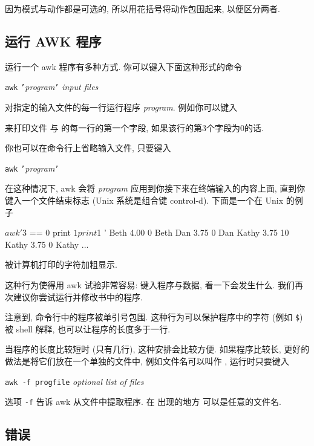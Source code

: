因为模式与动作都是可选的, 所以用花括号将动作包围起来, 以便区分两者.

\subsection{运行 AWK 程序}
\label{running_an_awk_program}

运行一个 awk 程序有多种方式. 你可以键入下面这种形式的命令
\begin{pattern}
    \texttt{awk} \texttt{'}\textit{program}\texttt{'} \textit{input files}
\end{pattern}
对指定的输入文件的每一行运行程序 \textit{program}. 例如你可以键入
来打印文件  与  的每一行的第一个字段,
如果该行的第3个字段为0的话.

你也可以在命令行上省略输入文件, 只要键入
\begin{pattern}
    \texttt{awk} \texttt{'}\textit{program}\texttt{'}
\end{pattern}
在这种情况下, awk 会将 \textit{program} 应用到你接下来在终端输入的内容上面,
直到你键入一个文件结束标志 (Unix 系统是组合键 control-d). 下面是一个在 Unix
的例子
\begin{shell}
    $ awk '$3 == 0 { print $1 print $1 }'
    Beth    4.00    0
    Beth
    Dan     3.75    0
    Dan
    Kathy   3.75    10
    Kathy   3.75    0
    Kathy
    ...
\end{shell}
被计算机打印的字符加粗显示.

这种行为使得用 awk 试验非常容易: 键入程序与数据, 看一下会发生什么. 我们再
次建议你尝试运行并修改书中的程序.

注意到, 命令行中的程序被单引号包围. 这种行为可以保护程序中的字符 (例如
\verb'$') 被 shell 解释, 也可以让程序的长度多于一行.

当程序的长度比较短时 (只有几行), 这种安排会比较方便. 如果程序比较长, 更好的
做法是将它们放在一个单独的文件中, 例如文件名可以叫作 ,
运行时只要键入
\begin{pattern}
    \texttt{awk -f progfile} \textit{optional list of files}
\end{pattern}
选项 \verb'-f' 告诉 awk 从文件中提取程序. 在  出现的地方
可以是任意的文件名.

\subsection{错误}
\label{subsec:errors}

